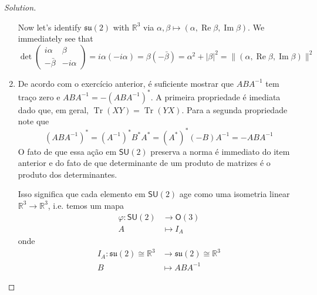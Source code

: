 \begin{proof}[Solution]
\begin{enumerate}[label=\alph*.]
Now let's identify $\mathfrak{su}(2)$ with $\mathbb{R}^{3}$ via $\alpha,\beta \mapsto (\alpha,\operatorname{Re}\beta,\operatorname{Im}\beta)$. We immediately see that
\[\det \begin{pmatrix} i\alpha&\beta\\-\bar{\beta} &-i\alpha\end{pmatrix} =i\alpha(-i\alpha)=\beta(-\bar{\beta} )=\alpha^2+|\beta|^2=\|(\alpha,\operatorname{Re}\beta,\operatorname{Im}\beta)\|^2\]

\item De acordo com o exercício anterior, é suficiente mostrar que $ABA^{-1}$ tem traço zero e $ABA^{-1}=-(ABA^{-1})^*$. A primeira propriedade é imediata dado que, em geral, $\operatorname{Tr}(XY)=\operatorname{Tr}(YX)$. Para a segunda propriedade note que
	\[(ABA^{-1})^*=(A^{-1})^*B^*A^*=(A^*)^*(-B)A^{-1}=-ABA^{-1}\]
	O fato de que essa ação em $\mathsf{SU}(2)$ preserva a norma é immediato do item anterior e do fato de que determinante de um produto de matrizes é o produto dos determinantes.

	Isso significa que cada elemento em $\mathsf{SU}(2)$ age como uma isometria linear $\mathbb{R}^{3}\to \mathbb{R}^{3}$, i.e. temos um mapa 
	\begin{align*}
	\varphi:\mathsf{SU}(2) &\longrightarrow \mathsf{O}(3) \\
	A &\longmapsto I_A
\end{align*}
onde
\begin{align*}
	I_A: \mathfrak{su}(2) \cong \mathbb{R}^{3} &\longrightarrow \mathfrak{su}(2) \cong \mathbb{R}^{3} \\
		B &\longmapsto ABA^{-1}
\end{align*}


\end{enumerate}
\end{proof}
